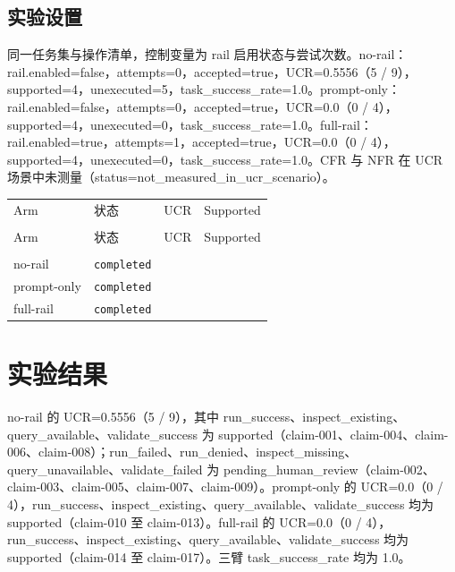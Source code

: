 \documentclass[UTF8]{ctexart}
\begin{document}
\subsection{实验设置}
同一任务集与操作清单，控制变量为 rail 启用状态与尝试次数。no-\allowbreak{}rail：rail.enabled=false，attempts=0，accepted=true，UCR=0.5556（5 / 9），supported=4，unexecuted=5，task\_\allowbreak{}success\_\allowbreak{}rate=1.0。prompt-\allowbreak{}only：rail.enabled=false，attempts=0，accepted=true，UCR=0.0（0 / 4），supported=4，unexecuted=0，task\_\allowbreak{}success\_\allowbreak{}rate=1.0。full-\allowbreak{}rail：rail.enabled=true，attempts=1，accepted=true，UCR=0.0（0 / 4），supported=4，unexecuted=0，task\_\allowbreak{}success\_\allowbreak{}rate=1.0。CFR 与 NFR 在 UCR 场景中未测量（status=not\_\allowbreak{}measured\_\allowbreak{}in\_\allowbreak{}ucr\_\allowbreak{}scenario）。
\begin{longtable}{@{}>{\raggedright\arraybackslash}p{}>{\raggedright\arraybackslash}p{}>{\raggedleft\arraybackslash}p{}>{\raggedleft\arraybackslash}p{}@{}}
\toprule
Arm & 状态 & UCR & Supported\\\\
\midrule
\endfirsthead
\toprule
Arm & 状态 & UCR & Supported\\\\
\midrule
\endhead
no-\allowbreak{}rail & \texttt{\scriptsize completed} & 0.5556 & 4 \\
prompt-\allowbreak{}only & \texttt{\scriptsize completed} & 0.0 & 4 \\
full-\allowbreak{}rail & \texttt{\scriptsize completed} & 0.0 & 4 \\
\bottomrule
\end{longtable}
\section{实验结果}
no-\allowbreak{}rail 的 UCR=0.5556（5 / 9），其中 run\_\allowbreak{}success、inspect\_\allowbreak{}existing、query\_\allowbreak{}available、validate\_\allowbreak{}success 为 supported（claim-\allowbreak{}001、claim-\allowbreak{}004、claim-\allowbreak{}006、claim-\allowbreak{}008）；run\_\allowbreak{}failed、run\_\allowbreak{}denied、inspect\_\allowbreak{}missing、query\_\allowbreak{}unavailable、validate\_\allowbreak{}failed 为 pending\_\allowbreak{}human\_\allowbreak{}review（claim-\allowbreak{}002、claim-\allowbreak{}003、claim-\allowbreak{}005、claim-\allowbreak{}007、claim-\allowbreak{}009）。prompt-\allowbreak{}only 的 UCR=0.0（0 / 4），run\_\allowbreak{}success、inspect\_\allowbreak{}existing、query\_\allowbreak{}available、validate\_\allowbreak{}success 均为 supported（claim-\allowbreak{}010 至 claim-\allowbreak{}013）。full-\allowbreak{}rail 的 UCR=0.0（0 / 4），run\_\allowbreak{}success、inspect\_\allowbreak{}existing、query\_\allowbreak{}available、validate\_\allowbreak{}success 均为 supported（claim-\allowbreak{}014 至 claim-\allowbreak{}017）。三臂 task\_\allowbreak{}success\_\allowbreak{}rate 均为 1.0。
\end{document}
